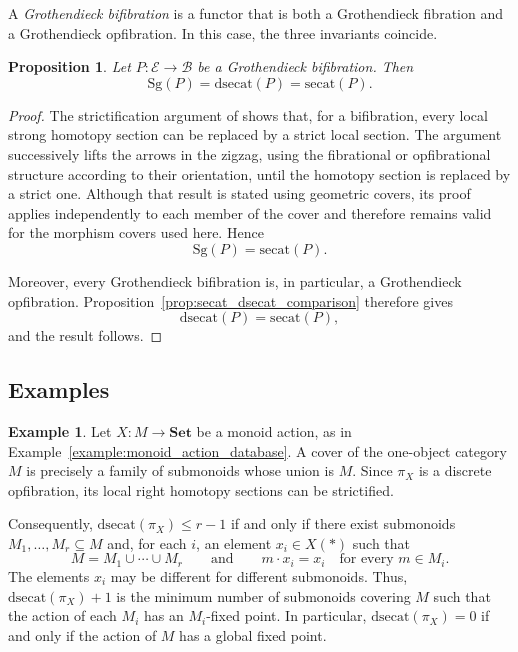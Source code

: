 \documentclass[12pt]{amsart}
\newtheorem{proposition}[teo]{Proposition}
\theoremstyle{definition}
\newtheorem{example}[teo]{Example}
\theoremstyle{remark}
\numberwithin{figure}{section}%
\newcommand{\Ba}{\mathcal{B}}
\newcommand{\E}{\mathcal{E}}
\newcommand{\Sets}{\mathbf{Set}}
\begin{document}
A \emph{Grothendieck bifibration} is a functor that is both a
Grothendieck fibration and a Grothendieck opfibration. In this case, the
three invariants coincide.

\begin{proposition}\label{prop:bifibration_sectional_categories}
Let \(P\colon\E\to\Ba\) be a Grothendieck bifibration. Then
\[
\mathrm{Sg}(P)
=
\mathrm{dsecat}(P)
=
\mathrm{secat}(P).
\]
\end{proposition}

\begin{proof}
The strictification argument of
\cite[Proposition~2.18]{Baues-Isaac} shows that, for a bifibration, every
local strong homotopy section can be replaced by a strict local section. The argument successively lifts the arrows in the zigzag, using the
fibrational or opfibrational structure according to their orientation,
until the homotopy section is replaced by a strict one.
Although that result is stated using geometric covers, its proof applies
independently to each member of the cover and therefore remains valid for
the morphism covers used here.  Hence
\[
\mathrm{Sg}(P)=\mathrm{secat}(P).
\]

Moreover, every Grothendieck bifibration is, in particular, a Grothendieck
opfibration. Proposition~\ref{prop:secat_dsecat_comparison} therefore gives
\[
\mathrm{dsecat}(P)=\mathrm{secat}(P),
\]
and the result follows.
\end{proof}

\subsection{Examples}\label{sec:examples_sectional}

\begin{example}\label{example:monoid_action_sectional_category}
Let \(X\colon M\to\Sets\) be a monoid action, as in
Example~\ref{example:monoid_action_database}. A cover of the one-object
category \(M\) is precisely a family of submonoids whose union is \(M\).
Since \(\pi_X\) is a discrete opfibration, its local right homotopy
sections can be strictified.

Consequently, \(\mathrm{dsecat}(\pi_X)\leq r-1\) if and only if there
exist submonoids \(M_1,\ldots,M_r\subseteq M\) and, for each \(i\), an
element \(x_i\in X(\ast)\) such that
\[
M=M_1\cup\cdots\cup M_r
\qquad\text{and}\qquad
m\cdot x_i=x_i
\quad
\text{for every }m\in M_i.
\]
The elements \(x_i\) may be different for different submonoids. Thus,
\(\mathrm{dsecat}(\pi_X)+1\) is the minimum number of submonoids covering
\(M\) such that the action of each \(M_i\) has an \(M_i\)-fixed point. In
particular, \(\mathrm{dsecat}(\pi_X)=0\) if and only if the action of
\(M\) has a global fixed point.
\end{example}
\end{document}

